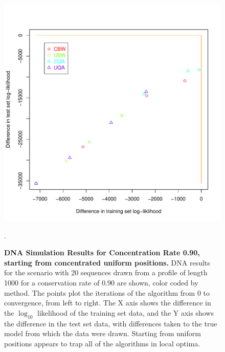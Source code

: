 \documentclass[preprint,12pt,authoryear]{elsarticle}
\begin{document}
\begin{figure}[htp]
\centering
\includegraphics[scale=.85]{DNA_uniformstart_results_90.pdf}
\caption{\textbf{DNA Simulation Results for Concentration Rate 0.90, starting from concentrated uniform positions.}  DNA results for the scenario with 20 sequences drawn from a profile of length 1000 for a conservation rate of $0.90$ are shown, color coded by method.  The points plot the iterations of the algorithm from 0 to convergence, from left to right.  The X axis shows the difference in the $\log_{10}$ likelihood of the training set data, and the Y axis shows the difference in the test set data, with differences taken to the true model from which the data were drawn.  Starting from uniform positions appears to trap all of the algorithms in local optima.}.
\label{fig:DNA_uniformstart_results_90}
\end{figure}


\end{document}
